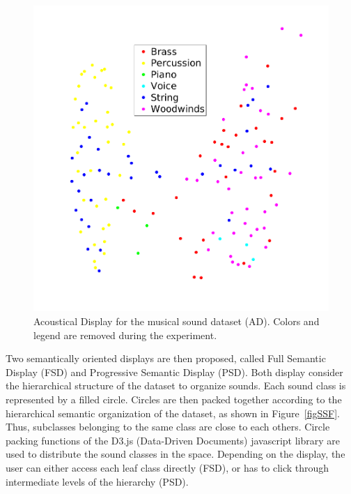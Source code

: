 \documentclass{aes2e}
\begin{document}
\begin{figure}[t]
\begin{center}
\includegraphics[width=\columnwidth]{gfx/music_mds.png} 
\end{center}
\caption{\label{figXP3music} Acoustical Display for the musical sound dataset (AD). Colors and legend are removed during the experiment.}
\end{figure}

Two semantically oriented displays are then proposed, called Full Semantic Display (FSD) and Progressive Semantic Display (PSD). Both display  consider the hierarchical structure of the dataset to organize sounds. Each sound class is represented by a filled circle. Circles are then packed together according to the hierarchical semantic organization of the dataset, as shown in Figure~\ref{figSSF}. Thus, subclasses belonging to the same class are close to each others. Circle packing functions of the D3.js (Data-Driven Documents) javascript library \cite{2011-d3} are used to distribute the sound classes in the space. Depending on the display, the user can either access each leaf class directly (FSD), or has to click through intermediate levels of the hierarchy (PSD). 
\end{document}
